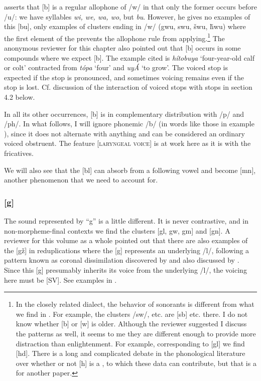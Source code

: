\documentclass[output=paper]{LSP/langsci}
\begin{document}
\citet[8]{Rankin2001} asserts that [b] is a regular allophone of /w/ in that only the former occurs before /u/: we have syllables \textit{wi, we, wa, wo}, but \textit{bu}. However, he gives no examples of this [bu], only examples of clusters ending in /w/ (gwu, swu, \v{s}wu, \v{h}wu) where the first element of the  prevents the allophone rule from applying.\footnote{In the closely related  dialect, the behavior of sonorants is different from what we find in . For example, the clusters /sw/, etc. are [sb] etc. there. I do not know whether [b] or [w] is older. Although the reviewer suggested I discuss the  patterns as well, it seems to me they are different enough to provide more distraction than enlightenment. For example, corresponding to  [gl] we find  [hd]. There is a long and complicated debate in the phonological literature over whether or not [h] is a , to which these  data can contribute, but that is a  for another paper.} The anonymous reviewer for this chapter also pointed out that [b] occurs in some compounds where we expect [b]. The example cited is \textit{h\'itobuya} `four-year-old calf or colt' contracted from \textit{t\'opa} `four' and \textit{uy\'A} `to grow'. The voiced stop is expected if the  stop is pronounced, and sometimes voicing remains even if the  stop is lost. Cf. discussion of the interaction of voiced stops with  stops in section 4.2 below.

In all its other occurrences, [b] is in complementary distribution with /p/ and /ph/. In what follows, I will ignore phonemic /b/ (in words like those in example ), since it does not alternate with anything and can be considered an ordinary voiced obstruent. The feature [\textsc{laryngeal voice}] is at work here as it is with the fricatives.

We will also see that the [bl]  can absorb  from a following vowel and become [mn], another phenomenon that we need to account for.

\subsubsection{[g]} 
The sound represented by ``g'' is a little different. It is never contrastive, and in non-morpheme-final contexts we find the clusters [gl, gw, gm] and [gn]. A reviewer for this volume as a whole pointed out that there are also examples of the  [g\v{z}] in reduplications where the [g] represents an underlying /l/, following a pattern known as coronal dissimilation discovered by \citet[225--226]{Carter1974} and also discussed by \citet[338]{Shaw1980}.  Since this [g] presumably inherits its voice from the underlying /l/, the voicing here must be [SV].  See examples in .
 
\end{document}

